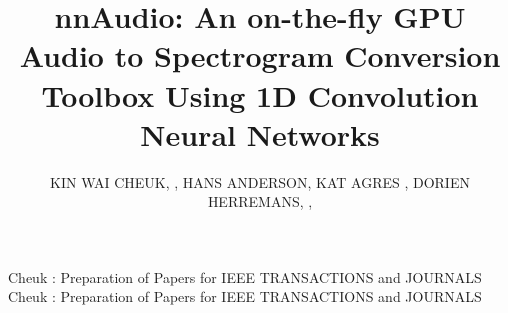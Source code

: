 \documentclass{ieeeaccess}
\begin{document}

\title{nnAudio: An on-the-fly GPU Audio to Spectrogram Conversion Toolbox Using 1D Convolution Neural Networks}
\author{\uppercase{Kin Wai Cheuk}, ,
\uppercase{Hans Anderson, Kat Agres , Dorien Herremans}, ,}
\address[1]{Information Systems, Technology and Design, Singapore University of Technology and Design, 8 Somapah Rd, Singapore 487372 (e-mail: kinwai\_cheuk@mymail.sutd.edu.sg, dorien\_herremans@sutd.edu.sg)}
\address[2]{Institute of High Performance Computing, Agency for Science, Technology and Research, 1 Fusionopolis Way, \#16-16 Connexis, Singapore 138632 (e-mail: kat\_agres@ihpc.a-star.edu.sg)}
\address[3]{Blue Mangoo Software (email: hans@bluemangoo.com)}

\markboth
{Cheuk \headeretal: Preparation of Papers for IEEE TRANSACTIONS and JOURNALS}
{Cheuk \headeretal: Preparation of Papers for IEEE TRANSACTIONS and JOURNALS}

\end{document}
